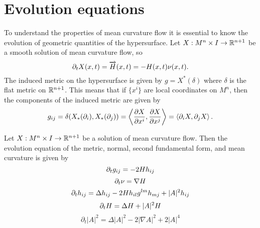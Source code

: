 \section{Evolution equations}
To understand the properties of mean curvature flow it is essential to know the evolution of geometric quantities of the hypersurface. Let $X : M^n \times I \to \mathbb{R}^{n+1}$ be a smooth solution of mean curvature flow, so 
\[ \partial_t X(x,t) = \overrightarrow{H}(x,t)  = -H(x,t)\nu(x,t).\]
The induced metric on the hypersurface is given by $g = X^*(\delta)$ where $\delta$ is the flat metric on $\mathbb{R}^{n+1}$. This means that if $\{x^i\}$ are local coordinates on $M^n$, then the components of the induced metric are given by
\[ g_{ij} = \delta(X_*(\partial_i),X_*(\partial_j)) = \left\langle  \frac{\partial X}{\partial x^i}, \frac{\partial X}{\partial x^j} \right\rangle = \left< \partial_{i}X, \partial_{j} X\right>.  \]
\begin{lemma}\label{evolutioneq}
     Let $X: M^n \times I \to \mathbb{R}^{n+1}$ be a solution of mean curvature flow. Then the evolution equation of the metric, normal, second fundamental form, and mean curvature is given by
\begin{equation}
    \partial_t g_{ij} = -2Hh_{ij}
\end{equation}
\begin{equation}
\partial_t \nu  = \nabla H
\end{equation}
\begin{equation}
\partial_t h_{ij} = \Delta h_{ij} - 2Hh_{il}g^{lm}h_{mj}+|A|^2h_{ij}
\end{equation}
\begin{equation}
    \partial_t H = \Delta H + |A|^2H \label{dtH}
\end{equation}
\begin{equation}
    \partial_{t}|A|^{2} = \Delta |A|^{2}-2|\nabla A|^{2} + 2|A|^{4}
\end{equation}
\end{lemma}

